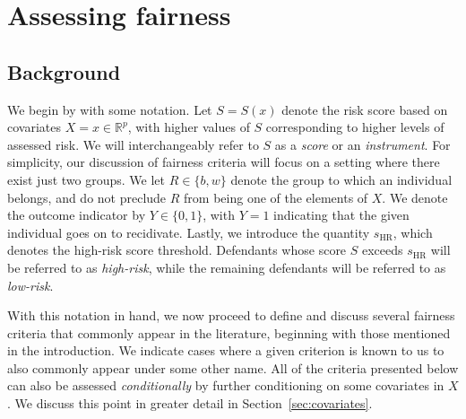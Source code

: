 \documentclass[11pt, svgnames]{article}
\newcommand{\R}{\mathbb{R}}
\numberwithin{equation}{section}
\theoremstyle{plain}
\theoremstyle{definition}
\numberwithin{prop}{section}
\numberwithin{corollary}{section}
\begin{document}
  
\section{Assessing fairness} \label{sec:fairness}

\subsection{Background} \label{sec:background}

We begin by with some notation.  Let $S = S(x)$ denote the risk score based on covariates \mbox{$X = x \in \R^p$}, with higher values of $S$ corresponding to higher levels of assessed risk.  We will interchangeably refer to $S$ as a \emph{score} or an \emph{instrument}.  For simplicity, our discussion of fairness criteria will focus on a setting where there exist just two groups.  We let $R \in \{b, w\}$ denote the group to which an individual belongs, and do not preclude $R$ from being one of the elements of $X$.  We denote the outcome indicator by $Y \in \{0 , 1\}$, with $Y = 1$ indicating that the given individual goes on to recidivate.  Lastly, we introduce the quantity $s_\mathrm{HR}$, which denotes the high-risk score threshold.  Defendants whose score $S$ exceeds $s_\mathrm{HR}$ will be referred to as \emph{high-risk}, while the remaining defendants will be referred to as \emph{low-risk}.  

  With this notation in hand, we now proceed to define and discuss several fairness criteria that commonly appear in the literature, beginning with those mentioned in the introduction.  We indicate cases where a given criterion is known to us to also commonly appear under some other name.  All of the criteria presented below can also be assessed \emph{conditionally} by further conditioning on some covariates in $X$.  We discuss this point in greater detail in Section~\ref{sec:covariates}.
  
\end{document}
